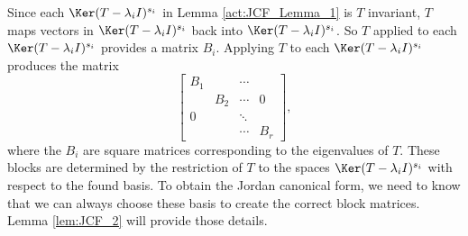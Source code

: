 Since each $\Ker(T-\lambda_i I)^{s_i}$ in Lemma \ref{act:JCF_Lemma_1} is $T$ invariant, $T$ maps vectors in $\Ker(T-\lambda_i I)^{s_i}$ back into $\Ker(T-\lambda_i I)^{s_i}$. So $T$ applied to each $\Ker(T-\lambda_i I)^{s_i}$ provides a matrix $B_i$. Applying $T$ to each $\Ker(T-\lambda_i I)^{s_i}$ produces the matrix 
\[\left[ \begin{array}{cccc} B_1  & &\cdots &   \\  &B_2 &\cdots & 0  \\ 0  & & \ddots &   \\   & &\cdots &  B_r \end{array} \right],\]
where the $B_i$ are square matrices corresponding to the eigenvalues of $T$. These blocks are determined by the restriction of $T$ to the spaces $\Ker(T-\lambda_i I)^{s_i}$ with respect to the found basis. To obtain the Jordan canonical form, we need to know that we can always choose these basis to create the correct block matrices. Lemma \ref{lem:JCF_2} will provide those details. 

